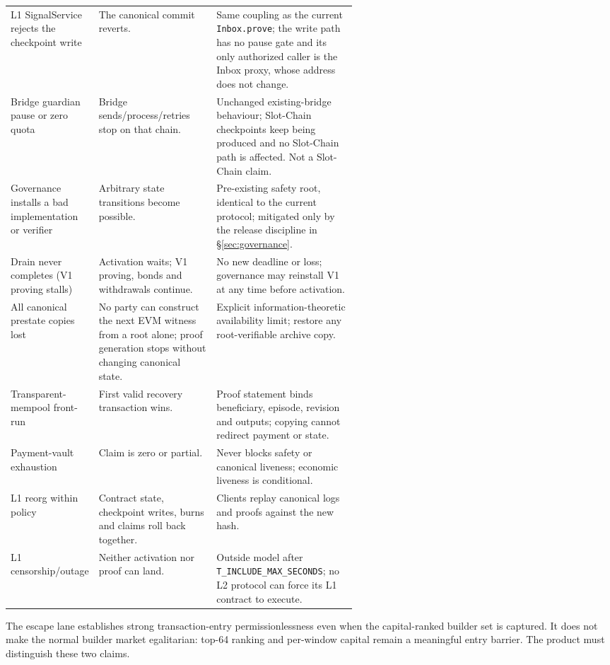 \documentclass[a4paper,11pt]{article}
\newcommand{\code}[1]{\nolinkurl{#1}}
\begin{document}
\begin{xltabular}{\linewidth}{p{0.23\linewidth}p{0.34\linewidth}X}
L1 SignalService rejects the checkpoint write & The canonical commit reverts. & Same coupling as the current \code{Inbox.prove}; the write path has no pause gate and its only authorized caller is the Inbox proxy, whose address does not change. \\
Bridge guardian pause or zero quota & Bridge sends/process/retries stop on that chain. & Unchanged existing-bridge behaviour; Slot-Chain checkpoints keep being produced and no Slot-Chain path is affected.  Not a Slot-Chain claim. \\
Governance installs a bad implementation or verifier & Arbitrary state transitions become possible. & Pre-existing safety root, identical to the current protocol; mitigated only by the release discipline in \S\ref{sec:governance}. \\
Drain never completes (V1 proving stalls) & Activation waits; V1 proving, bonds and withdrawals continue. & No new deadline or loss; governance may reinstall V1 at any time before activation. \\
All canonical prestate copies lost & No party can construct the next EVM witness from a root alone; proof generation stops without changing canonical state. & Explicit information-theoretic availability limit; restore any root-verifiable archive copy. \\
Transparent-mempool front-run & First valid recovery transaction wins. & Proof statement binds beneficiary, episode, revision and outputs; copying cannot redirect payment or state. \\
Payment-vault exhaustion & Claim is zero or partial. & Never blocks safety or canonical liveness; economic liveness is conditional. \\
L1 reorg within policy & Contract state, checkpoint writes, burns and claims roll back together. & Clients replay canonical logs and proofs against the new hash. \\
L1 censorship/outage & Neither activation nor proof can land. & Outside model after \code{T_INCLUDE_MAX_SECONDS}; no L2 protocol can force its L1 contract to execute. \\
\bottomrule
\end{xltabular}

The escape lane establishes strong transaction-entry permissionlessness even
when the capital-ranked builder set is captured.  It does not make the normal
builder market egalitarian: top-64 ranking and per-window capital remain a
meaningful entry barrier.  The product must distinguish these two claims.
\end{document}
